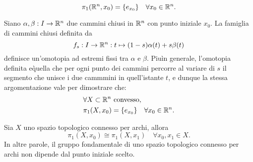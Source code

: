 \documentclass[]{article}
\begin{document}
    \begin{example} \nl
        \[
            \pi_1(\mathbb{R}^n, x_0) = \{ e_{x_0} \} \quad \forall x_0 \in \mathbb{R}^n.
        \]

        Siano $\alpha, \beta: I \to \mathbb{R}^n$ due cammini chiusi in $\mathbb{R}^n$ con punto iniziale $x_0$. \nl
        La famiglia di cammini chiusi definita da
        \[
            f_s: I \to \mathbb{R}^n: t \mapsto (1-s) \alpha(t) + s \beta(t)
        \]
        definisce un'omotopia ad estremi fissi tra $\alpha$ e $\beta$. \nl
        Piu\` in generale, l'omotopia definita e\` quella che per ogni punto dei cammini percorre al variare di $s$
        il segmento che unisce i due cammmini in quell'istante $t$, e dunque la stessa argomentazione vale per dimostrare che:
       \[
        \begin{aligned}
            &\forall X \subset \mathbb{R}^n \text{ convesso}, \\
            &\pi_1(X, x_0) = \{ e_{x_0} \} \quad \forall x_0 \in \mathbb{R}^n.
        \end{aligned}
        \]
    \end{example}

    \begin{proposition}  \nl
        Sia $X$ uno spazio topologico connesso per archi, allora
        \[
            \pi_1(X, x_0) \cong \pi_1(X, x_1) \quad \forall x_0, x_1 \in X.
        \]
        In altre parole, il gruppo fondamentale di uno spazio topologico connesso per archi non dipende dal punto iniziale scelto.
    \end{proposition}
\end{document}
